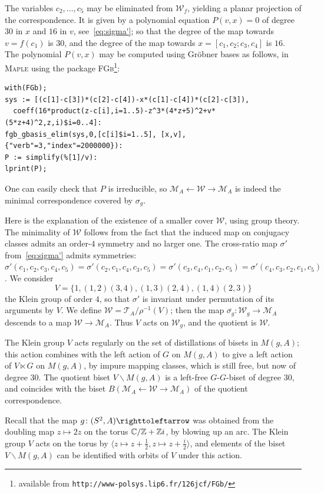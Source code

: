 \documentclass{amsart}
\begin{document}
The variables $c_2,\dots,c_5$ may be eliminated from $\mathscr W_f$,
yielding a planar projection of the correspondence. It is given by a
polynomial equation $P(v,x)=0$ of degree $30$ in $x$ and $16$ in $v$,
see~\eqref{eq:sigma'}; so that the degree of the map towards
$v=f(c_1)$ is $30$, and the degree of the map towards
$x=[c_1,c_2;c_3,c_4]$ is $16$. The polynomial $P(v,x)$ may be computed
using Gr\"obner bases as follows, in \textsc{Maple} using the package
\textsc{FGb}\footnote{available from \texttt{http://www-polsys.lip6.fr/\char126jcf/FGb/}}:
\begin{verbatim}
with(FGb);
sys := [(c[1]-c[3])*(c[2]-c[4])-x*(c[1]-c[4])*(c[2]-c[3]),
  coeff(16*product(z-c[i],i=1..5)-z^3*(4*z+5)^2+v*(5*z+4)^2,z,i)$i=0..4]:
fgb_gbasis_elim(sys,0,[c[i]$i=1..5], [x,v],{"verb"=3,"index"=2000000}):
P := simplify(%[1]/v):
lprint(P);
\end{verbatim}
One can easily check that $P$ is irreducible, so
$\mathscr M_A\leftarrow\mathscr W\rightarrow\mathscr M_A$ is indeed
the minimal correspondence covered by $\sigma_g$.

Here is the explanation of the existence of a smaller cover $\mathscr
W$, using group theory. The minimality of $\mathscr W$ follows from
the fact that the induced map on conjugacy classes admits an order-$4$
symmetry and no larger one. The cross-ratio map $\sigma'$
from~\eqref{eq:sigma'} admits symmetries:
$\sigma'(c_1,c_2,c_3,c_4,c_5)=\sigma'(c_2,c_1,c_4,c_3,c_5)=\sigma'(c_3,c_4,c_1,c_2,c_5)=\sigma'(c_4,c_3,c_2,c_1,c_5)$. We
consider
\[V=\{1,(1,2)(3,4),(1,3)(2,4),(1,4)(2,3)\}
\]
the Klein group of order $4$, so that $\sigma'$ is invariant under
permutation of its arguments by $V$. We define $\mathscr W=\mathscr
T_A/\rho^{-1}(V)$; then the map $\overline{\sigma_g}\colon\mathscr
W_g\to\mathscr M_A$ descends to a map $\mathscr W\to\mathscr
M_A$. Thus $V$ acts on $\mathscr W_g$, and the quotient is $\mathscr
W$.

The Klein group $V$ acts regularly on the set of distillations of
bisets in $M(g,A)$; this action combines with the left action of $G$
on $M(g,A)$ to give a left action of $V\ltimes G$ on $M(g,A)$, by
impure mapping classes, which is still free, but now of degree
$30$. The quotient biset $V\backslash M(g,A)$ is a left-free
$G$-$G$-biset of degree $30$, and coincides with the biset $B(\mathscr
M_A\leftarrow\mathscr W\rightarrow\mathscr M_A)$ of the quotient
correspondence.

Recall that the map $g\colon(S^2,A)\selfmap$ was obtained from the
doubling map $z\mapsto 2z$ on the torus ${\mathbb C}/{\mathbb Z}+{\mathbb Z} i$, by blowing up an
arc. The Klein group $V$ acts on the torus by $\langle z\mapsto
z+\frac12,z\mapsto z+\frac i2\rangle$, and elements of the biset
$V\backslash M(g,A)$ can be identified with orbits of $V$ under this
action.
\end{document}
